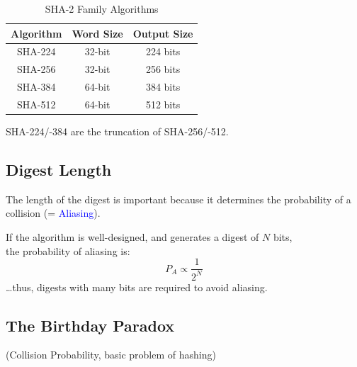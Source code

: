 \begin{table}[H]
    \centering
    \begin{tabular}{|c|c|c|}
        \hline
        \textbf{Algorithm} & \textbf{Word Size} & \textbf{Output Size} \\
        \hline
        SHA-224 & 32-bit & 224 bits \\
        \hline
        SHA-256 & 32-bit & 256 bits \\
        \hline
        SHA-384 & 64-bit & 384 bits \\
        \hline
        SHA-512 & 64-bit & 512 bits \\
        \hline
    \end{tabular}
    \caption{SHA-2 Family Algorithms}
\end{table}

SHA-224/-384 are the truncation of SHA-256/-512.

\subsection{Digest Length}
The length of the digest is important because it determines the probability of a collision (= \textcolor{Blue}{Aliasing}). 

If the algorithm is well-designed, and generates a digest of $N$ bits, \\ the probability of aliasing is:
\[
    P_A \propto \frac{1}{2^{N}}
\]
\dots thus, digests with many bits are required to avoid aliasing.

\subsection{The Birthday Paradox}
\begin{center}
    (Collision Probability, basic problem of hashing)
\end{center}

